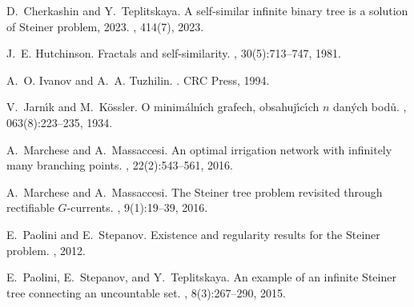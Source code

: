 \documentclass{amsart}
\theoremstyle{definition}
\theoremstyle{remark}
\begin{document}

%
\begin{thebibliography}{1}

  D.~Cherkashin and Y.~Teplitskaya.
  \newblock A self-similar infinite binary tree is a solution of Steiner problem,
    2023.
  , 
  414(7), 2023.
  
  J.~E. Hutchinson.
  \newblock Fractals and self-similarity.
  , 30(5):713--747, 1981.
  
  A.~O. Ivanov and A.~A. Tuzhilin.
  .
  \newblock CRC Press, 1994.
  
  V.~Jarn\'\i{}k and M.~K\"o{}ssler.
  \newblock O minim\'a{}ln\'\i{}ch grafech, obsahuj\'\i{}c\'\i{}ch $n$ dan\'y{}ch
    bod\r u{}.
  ,
    063(8):223--235, 1934.
  
  A.~Marchese and A.~Massaccesi.
  \newblock An optimal irrigation network with infinitely many branching points.
  , 22(2):543--561, 2016.
  
  A.~Marchese and A.~Massaccesi.
  \newblock The {S}teiner tree problem revisited through rectifiable
    {$G$}-currents.
  , 9(1):19--39, 2016.
  
  E.~Paolini and E.~Stepanov.
  \newblock Existence and regularity results for the Steiner problem.
  , 2012.
  
  E.~Paolini, E.~Stepanov, and Y.~Teplitskaya.
  \newblock An example of an infinite {S}teiner tree connecting an uncountable
    set.
  , 8(3):267--290, 2015.
\end{thebibliography}
    
\end{document}
